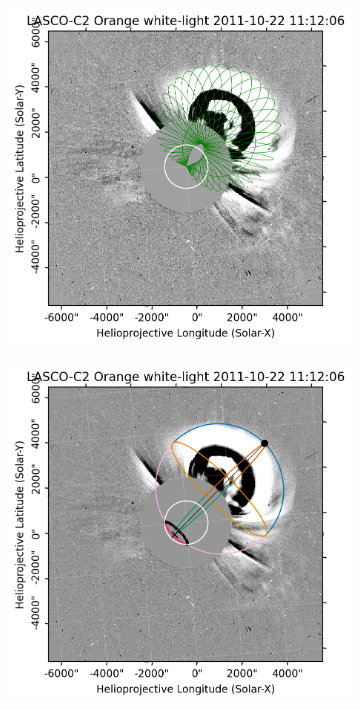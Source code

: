 \begin{figure}[!htp]
\begin{subfigure}[b]{0.3\textwidth}
	\end{subfigure}
	\hfill
	\begin{subfigure}[b]{0.3\textwidth}
		\includegraphics[width=\textwidth]{chapter2/figs/Fig_g1.png}
	\end{subfigure}
	\medskip %
	\begin{subfigure}[b]{0.3\textwidth}
		\includegraphics[width=\textwidth]{chapter2/figs/Fig_s2.png}

\end{subfigure}
\end{figure}
